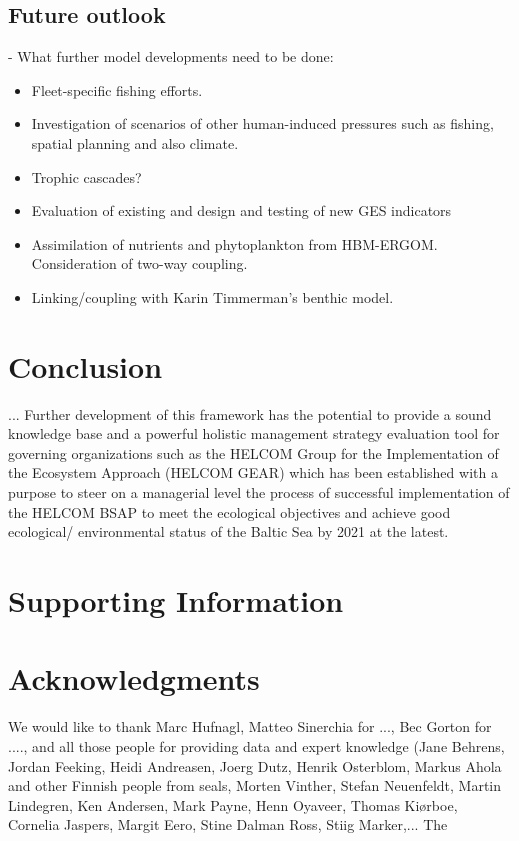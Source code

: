 \documentclass[10pt,letterpaper]{article}
\begin{document}
\subsection{Future outlook}
- What further model developments need to be done:
\begin{itemize}
\item Fleet-specific fishing efforts.
\item Investigation of scenarios of other human-induced pressures such as fishing, spatial planning and also climate.
\item Trophic cascades?
\item Evaluation of existing and design and testing of new GES indicators
\item Assimilation of nutrients and phytoplankton from HBM-ERGOM. Consideration of two-way coupling.
\item Linking/coupling with Karin Timmerman's benthic model.
\end{itemize}

\section*{Conclusion}

...
Further development of this framework has the potential to provide a sound knowledge base and a powerful holistic management strategy evaluation tool for governing organizations such as the HELCOM Group for the Implementation of the Ecosystem Approach (HELCOM GEAR) which has been established with a purpose to steer on a managerial level the process of successful implementation of the HELCOM BSAP to meet the ecological objectives and achieve good ecological/ environmental status of the Baltic Sea by 2021 at the latest.

\section*{Supporting Information}


\section*{Acknowledgments}
We would like to thank Marc Hufnagl, Matteo Sinerchia for ..., Bec Gorton for ...., and all those people for providing data and expert knowledge (Jane Behrens, Jordan Feeking, Heidi Andreasen, Joerg Dutz, Henrik Osterblom, Markus Ahola and other Finnish people from seals, Morten Vinther, Stefan Neuenfeldt, Martin Lindegren, Ken Andersen, Mark Payne, Henn Oyaveer, Thomas Kiørboe, Cornelia Jaspers, Margit Eero, Stine Dalman Ross, Stiig Marker,...
The 
\end{document}
